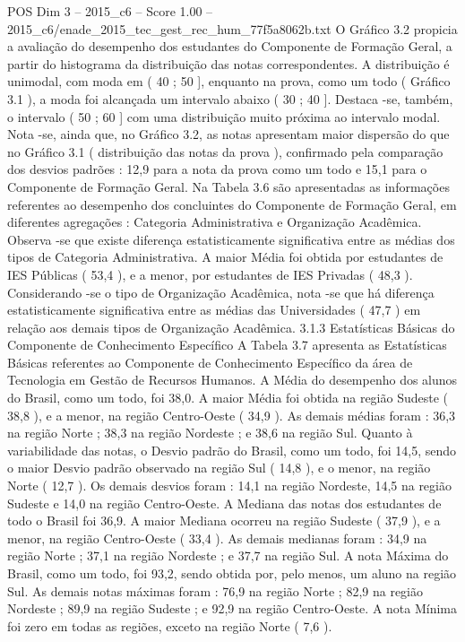 \begin{textsample}{POS Dim 3 – 2015\_c6 – Score 1.00 – 2015\_c6/enade\_2015\_tec\_gest\_rec\_hum\_77f5a8062b.txt}
O Gráfico 3.2 propicia a avaliação do desempenho dos estudantes do Componente de Formação Geral, a partir do histograma da distribuição das notas correspondentes.
A distribuição é unimodal, com moda em ( 40 ; 50 ], enquanto na prova, como um todo ( Gráfico 3.1 ), a moda foi alcançada um intervalo abaixo ( 30 ; 40 ].
Destaca -se, também, o intervalo ( 50 ; 60 ] com uma distribuição muito próxima ao intervalo modal.
Nota -se, ainda que, no Gráfico 3.2, as notas apresentam maior dispersão do que no Gráfico 3.1 ( distribuição das notas da prova ), confirmado pela comparação dos desvios padrões : 12,9 para a nota da prova como um todo e 15,1 para o Componente de Formação Geral.
Na Tabela 3.6 são apresentadas as informações referentes ao desempenho dos concluintes do Componente de Formação Geral, em diferentes agregações : Categoria Administrativa e Organização Acadêmica.
Observa -se que existe diferença estatisticamente significativa entre as médias dos tipos de Categoria Administrativa.
A maior Média foi obtida por estudantes de IES Públicas ( 53,4 ), e a menor, por estudantes de IES Privadas ( 48,3 ).
Considerando -se o tipo de Organização Acadêmica, nota -se que há diferença estatisticamente significativa entre as médias das Universidades ( 47,7 ) em relação aos demais tipos de Organização Acadêmica. 3.1.3 Estatísticas Básicas do Componente de Conhecimento Específico A Tabela 3.7 apresenta as Estatísticas Básicas referentes ao Componente de Conhecimento Específico da área de Tecnologia em Gestão de Recursos Humanos.
A Média do desempenho dos alunos do Brasil, como um todo, foi 38,0.
A maior Média foi obtida na região Sudeste ( 38,8 ), e a menor, na região Centro-Oeste ( 34,9 ).
As demais médias foram : 36,3 na região Norte ; 38,3 na região Nordeste ; e 38,6 na região Sul.
Quanto à variabilidade das notas, o Desvio padrão do Brasil, como um todo, foi 14,5, sendo o maior Desvio padrão observado na região Sul ( 14,8 ), e o menor, na região Norte ( 12,7 ).
Os demais desvios foram : 14,1 na região Nordeste, 14,5 na região Sudeste e 14,0 na região Centro-Oeste.
A Mediana das notas dos estudantes de todo o Brasil foi 36,9.
A maior Mediana ocorreu na região Sudeste ( 37,9 ), e a menor, na região Centro-Oeste ( 33,4 ).
As demais medianas foram : 34,9 na região Norte ; 37,1 na região Nordeste ; e 37,7 na região Sul.
A nota Máxima do Brasil, como um todo, foi 93,2, sendo obtida por, pelo menos, um aluno na região Sul.
As demais notas máximas foram : 76,9 na região Norte ; 82,9 na região Nordeste ; 89,9 na região Sudeste ; e 92,9 na região Centro-Oeste.
A nota Mínima foi zero em todas as regiões, exceto na região Norte ( 7,6 ).

\end{textsample}
